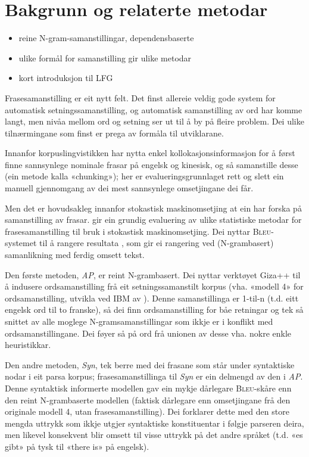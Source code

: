 \documentclass[11pt,a4paper,oneside,draft]{book}
\begin{document}
\chapter{Bakgrunn og relaterte metodar}
\label{sec-2}

\begin{itemize}
\item reine N-gram-samanstillingar, dependensbaserte
\item ulike formål for samanstilling gir ulike metodar
\item kort introduksjon til LFG
\end{itemize}
Frasesamanstilling er eit nytt felt. Det finst allereie veldig gode
system for automatisk setningssamanstilling, og automatisk
samanstilling av ord har komme langt, men nivåa mellom ord og setning
ser ut til å by på fleire problem. Dei ulike tilnærmingane som finst
er prega av formåla til utviklarane.

Innanfor korpuslingvistikken har \citet{piao2001mwu} nytta enkel
kollokasjonsinformasjon for å først finne sannsynlege nominale frasar
på engelsk og kinesisk, og så samanstille desse (ein metode kalla
«chunking»); her er evalueringsgrunnlaget rett og slett ein manuell
gjennomgang av dei mest sannsynlege omsetjingane dei får.

Men det er hovudsakleg innanfor stokastisk maskinomsetjing at ein har
forska på samanstilling av frasar. \citet{koehn2003spb} gir ein
grundig evaluering av ulike statistiske metodar for frasesamanstilling
til bruk i stokastisk maskinomsetjing. Dei nyttar
\textsc{Bleu}-systemet til å rangere resultata
\citep[Papineni~et~al.,~2001,~i][s.~51]{koehn2003spb}, som gir ei
rangering ved (N-grambasert) samanlikning med ferdig omsett tekst.

Den første metoden, \emph{AP}, er reint N-grambasert. Dei nyttar verktøyet
Giza++ \citep[Och~og~Ney,~2000,~i][s.~50]{koehn2003spb} til å indusere
ordsamanstilling frå eit setningssamanstilt korpus (vha. «modell 4»
for ordsamanstilling, utvikla ved IBM av \citet{brown1993msm}). Denne
samanstillinga er 1-til-n (t.d. eitt engelsk ord til to franske), så
dei finn ordsamanstilling for båe retningar og tek så snittet av alle
moglege N-gramsamanstillingar som ikkje er i konflikt med
ordsamanstillingane. Dei føyer så på ord frå unionen av desse
vha. nokre enkle heuristikkar.

Den andre metoden, \emph{Syn}, tek berre med dei frasane som står under
syntaktiske nodar i eit parsa korpus; frasesamanstillinga til \emph{Syn} er
ein delmengd av den i \emph{AP}. Denne syntaktisk informerte modellen gav ein
mykje dårlegare \textsc{Bleu}-skåre enn den reint N-grambaserte
modellen (faktisk dårlegare enn omsetjingane frå den originale modell
4, utan frasesamanstilling). Dei forklarer dette med den store mengda
uttrykk som ikkje utgjer syntaktiske konstituentar i følgje parseren
deira, men likevel konsekvent blir omsett til visse uttrykk på det
andre språket (t.d. «es gibt» på tysk til «there is» på engelsk).
\end{document}
